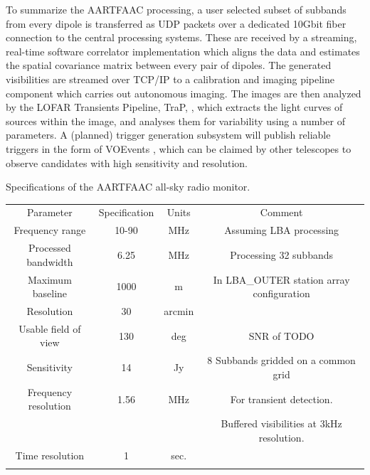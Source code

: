 \documentclass{ws-jai}
\begin{document}
To summarize  the AARTFAAC processing, a  user selected subset of  subbands from
every  dipole is  transferred  as  UDP packets  over  a  dedicated 10Gbit  fiber
connection  to  the  central  processing  systems.   These  are  received  by  a
streaming, real-time  software correlator  implementation which aligns  the data
and estimates the spatial covariance matrix  between every pair of dipoles.  The
generated visibilities  are streamed  over TCP/IP to  a calibration  and imaging
pipeline component  which carries out  autonomous imaging.  The images  are then
analyzed      by       the      LOFAR      Transients       Pipeline,      TraP,
\citep[TraP;][]{swinbank2015lofar}, which  extracts the light curves  of sources
within  the  image,  and  analyses  them  for  variability  using  a  number  of
parameters.   A (planned)  trigger  generation subsystem  will publish  reliable
triggers  in  the form  of  VOEvents  \cite{williams2006voevent}, which  can  be
claimed  by other  telescopes to  observe candidates  with high  sensitivity and
resolution.



\begin{wstable}[h]
\caption{Specifications of the AARTFAAC all-sky radio monitor.}
\begin{tabular}{@{}cccc@{}} \toprule
Parameter & Specification & Units & Comment\\ \colrule
Frequency range & 10-90 & MHz & Assuming LBA processing  \\
Processed bandwidth & 6.25 & MHz & Processing 32 subbands \\
Maximum baseline & 1000 & m & In LBA\_OUTER station array configuration\\
Resolution & 30 & arcmin & \\
Usable field of view & 130 & deg & SNR of TODO \\
Sensitivity & 14 & Jy & 8 Subbands gridded on a common grid \\
Frequency resolution & 1.56 & MHz & For transient detection. \\
 & & & Buffered visibilities at 3kHz resolution.\\
Time resolution & 1 & sec.\\ \colrule

\end{tabular}
\label{tab:afaac_specs}
\end{wstable}
\end{document}
